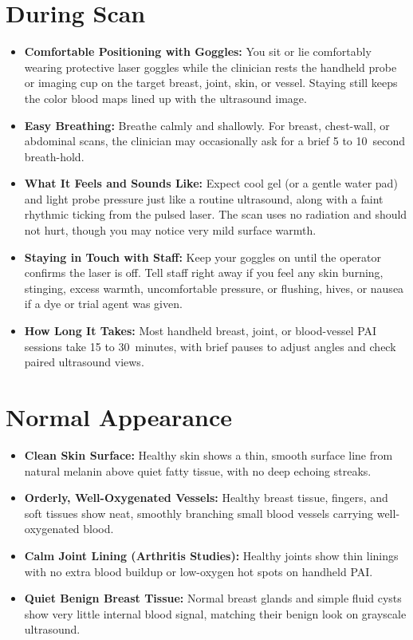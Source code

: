 \section{During Scan}
\begin{itemize}
  \item \textbf{Comfortable Positioning with Goggles:} You sit or lie comfortably wearing protective laser goggles while the clinician rests the handheld probe or imaging cup on the target breast, joint, skin, or vessel. Staying still keeps the color blood maps lined up with the ultrasound image.
  \item \textbf{Easy Breathing:} Breathe calmly and shallowly. For breast, chest-wall, or abdominal scans, the clinician may occasionally ask for a brief 5 to 10~second breath-hold.
  \item \textbf{What It Feels and Sounds Like:} Expect cool gel (or a gentle water pad) and light probe pressure just like a routine ultrasound, along with a faint rhythmic ticking from the pulsed laser. The scan uses no radiation and should not hurt, though you may notice very mild surface warmth.
  \item \textbf{Staying in Touch with Staff:} Keep your goggles on until the operator confirms the laser is off. Tell staff right away if you feel any skin burning, stinging, excess warmth, uncomfortable pressure, or flushing, hives, or nausea if a dye or trial agent was given.
  \item \textbf{How Long It Takes:} Most handheld breast, joint, or blood-vessel PAI sessions take 15 to 30~minutes, with brief pauses to adjust angles and check paired ultrasound views.
\end{itemize}

\section{Normal Appearance}
\begin{itemize}
  \item \textbf{Clean Skin Surface:} Healthy skin shows a thin, smooth surface line from natural melanin above quiet fatty tissue, with no deep echoing streaks.
  \item \textbf{Orderly, Well-Oxygenated Vessels:} Healthy breast tissue, fingers, and soft tissues show neat, smoothly branching small blood vessels carrying well-oxygenated blood.
  \item \textbf{Calm Joint Lining (Arthritis Studies):} Healthy joints show thin linings with no extra blood buildup or low-oxygen hot spots on handheld PAI.
  \item \textbf{Quiet Benign Breast Tissue:} Normal breast glands and simple fluid cysts show very little internal blood signal, matching their benign look on grayscale ultrasound.
\end{itemize}

